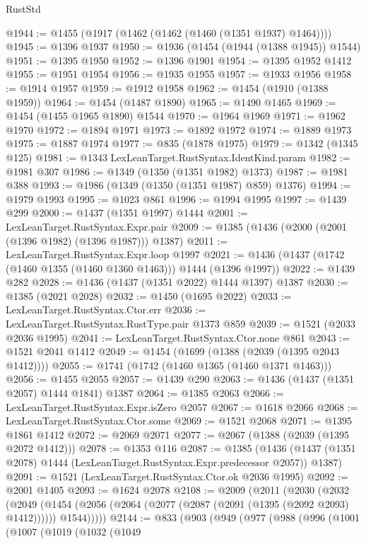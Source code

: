 \begin{lexlean}{RustStd}
\begin{coremodule}
{\begin{coremodule}
{{{{{{{{{{@1944 := @1455 (@1917 (@1462 (@1462 (@1460 (@1351 @1937) @1464))))
@1945 := @1396 @1937
@1950 := @1936 (@1454 (@1944 (@1388 @1945)) @1544)
@1951 := @1395 @1950
@1952 := @1396 @1901
@1954 := @1395 @1952 @1412
@1955 := @1951 @1954
@1956 := @1935 @1955
@1957 := @1933 @1956
@1958 := @1914 @1957
@1959 := @1912 @1958
@1962 := @1454 (@1910 (@1388 @1959))
@1964 := @1454 (@1487 @1890)
@1965 := @1490 @1465
@1969 := @1454 (@1455 @1965 @1890) @1544
@1970 := @1964 @1969
@1971 := @1962 @1970
@1972 := @1894 @1971
@1973 := @1892 @1972
@1974 := @1889 @1973
@1975 := @1887 @1974
@1977 := @835 (@1878 @1975)
@1979 := @1342 (@1345 @125)
@1981 := @1343 LexLeanTarget.RustSyntax.IdentKind.param
@1982 := @1981 @307
@1986 := @1349 (@1350 (@1351 @1982) @1373)
@1987 := @1981 @388
@1993 := @1986 (@1349 (@1350 (@1351 @1987) @859) @1376)
@1994 := @1979 @1993
@1995 := @1023 @861
@1996 := @1994 @1995
@1997 := @1439 @299
@2000 := @1437 (@1351 @1997) @1444
@2001 := LexLeanTarget.RustSyntax.Expr.pair
@2009 := @1385 (@1436 (@2000 (@2001 (@1396 @1982) (@1396 @1987))) @1387)
@2011 := LexLeanTarget.RustSyntax.Expr.loop @1997
@2021 := @1436 (@1437 (@1742 (@1460 @1355 (@1460 @1360 @1463))) @1444 (@1396 @1997))
@2022 := @1439 @282
@2028 := @1436 (@1437 (@1351 @2022) @1444 @1397) @1387
@2030 := @1385 (@2021 @2028)
@2032 := @1450 (@1695 @2022)
@2033 := LexLeanTarget.RustSyntax.Ctor.err
@2036 := LexLeanTarget.RustSyntax.RustType.pair @1373 @859
@2039 := @1521 (@2033 @2036 @1995)
@2041 := LexLeanTarget.RustSyntax.Ctor.none @861
@2043 := @1521 @2041 @1412
@2049 := @1454 (@1699 (@1388 (@2039 (@1395 @2043 @1412))))
@2055 := @1741 (@1742 (@1460 @1365 (@1460 @1371 @1463)))
@2056 := @1455 @2055
@2057 := @1439 @290
@2063 := @1436 (@1437 (@1351 @2057) @1444 @1841) @1387
@2064 := @1385 @2063
@2066 := LexLeanTarget.RustSyntax.Expr.isZero @2057
@2067 := @1618 @2066
@2068 := LexLeanTarget.RustSyntax.Ctor.some
@2069 := @1521 @2068
@2071 := @1395 @1861 @1412
@2072 := @2069 @2071
@2077 := @2067 (@1388 (@2039 (@1395 @2072 @1412)))
@2078 := @1353 @116
@2087 := @1385
    (@1436 (@1437 (@1351 @2078) @1444 (LexLeanTarget.RustSyntax.Expr.predecessor @2057)) @1387)
@2091 := @1521 (LexLeanTarget.RustSyntax.Ctor.ok @2036 @1995)
@2092 := @2001 @1405
@2093 := @1624 @2078
@2108 := @2009
    (@2011
      (@2030
        (@2032
          (@2049
            (@1454 (@2056 (@2064 (@2077 (@2087 (@2091 (@1395 (@2092 @2093) @1412)))))) @1544)))))
@2144 := @833
    (@903
      (@949
        (@977
          (@988
            (@996
              (@1001
                (@1007
                  (@1019
                    (@1032
                      (@1049
}}}}}}}}}}
\end{coremodule}}
\end{coremodule}
\end{lexlean}
